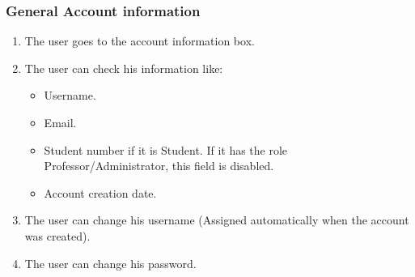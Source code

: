 \subsubsection{General Account information}

\begin{enumerate}
    \item The user goes to the account information box.
    \item The user can check his information like:
    \begin{itemize}
        \item Username.
        \item Email.
        \item Student number if it is Student. If it has the role Professor/Administrator, this field is disabled.
        \item Account creation date.
    \end{itemize}
    \item The user can change his username (Assigned automatically when the account was created).
    \item The user can change his password.
\end{enumerate}